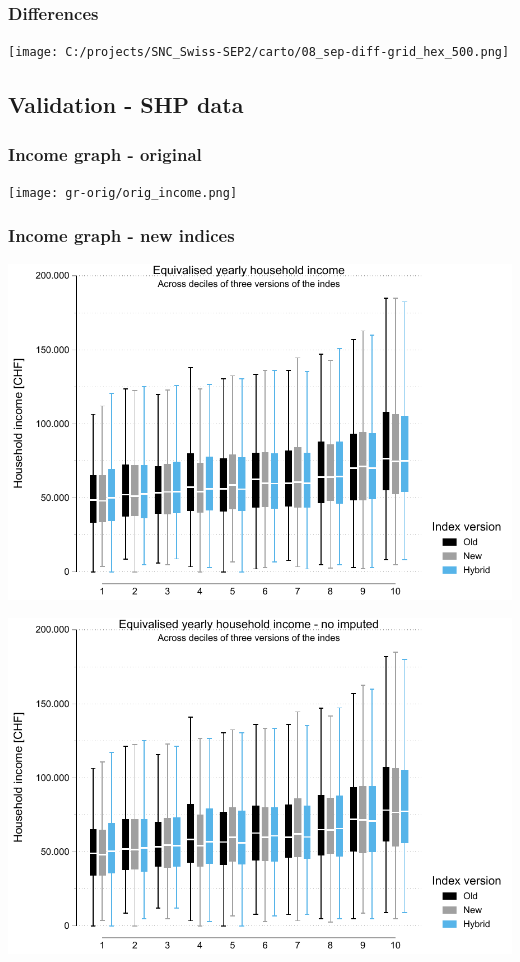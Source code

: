 \documentclass[a4paper, notitlepage, fleqn]{article} %
\begin{document}
\subsubsection{Differences}
\begin{center}
\texttt{[image: C:/projects/SNC\_Swiss-SEP2/carto/08\_sep-diff-grid\_hex\_500.png]} 
\end{center}
\newpage
\subsection{Validation - SHP data}

\subsubsection{Income graph - original}

\begin{center}
\texttt{[image: gr-orig/orig\_income.png]} 
\end{center}

\subsubsection{Income graph - new indices}
\begin{center}
\includegraphics[width=.75\textwidth]{gr/shp_income.pdf} 
\end{center}

\newpage
\begin{center}
\includegraphics[width=.75\textwidth]{gr/shp_income_imp.pdf} 
\end{center}
\end{document}
